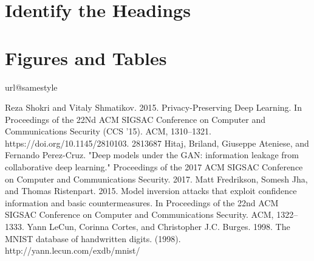 \documentclass[conference]{IEEEtran}
\begin{document}
\section{Identify the Headings}


\section{Figures and Tables}



%
\begin{thebibliography}{10}
\providecommand{\url}[1]{#1}
\csname url@samestyle\endcsname
\providecommand{\newblock}{\relax}
\providecommand{\bibinfo}[2]{#2}
\providecommand{\BIBentrySTDinterwordspacing}{\spaceskip=0pt\relax}
\providecommand{\BIBentryALTinterwordstretchfactor}{4}
\providecommand{\BIBentryALTinterwordspacing}{\spaceskip=\fontdimen2\font plus
\BIBentryALTinterwordstretchfactor\fontdimen3\font minus
  \fontdimen4\font\relax}
\providecommand{\BIBforeignlanguage}[2]{{%
\expandafter\ifx\csname l@#1\endcsname\relax
\typeout{** WARNING: IEEEtran.bst: No hyphenation pattern has been}%
\typeout{** loaded for the language `#1'. Using the pattern for}%
\typeout{** the default language instead.}%
\else
\language=\csname l@#1\endcsname
\fi
#2}}
\providecommand{\BIBdecl}{\relax}
\BIBdecl

Reza Shokri and Vitaly Shmatikov. 2015. Privacy-Preserving Deep Learning.
In Proceedings of the 22Nd ACM SIGSAC Conference on Computer and Communications
Security (CCS ’15). ACM, 1310–1321. https://doi.org/10.1145/2810103.
2813687
Hitaj, Briland, Giuseppe Ateniese, and Fernando Perez-Cruz. "Deep models under the GAN: information leakage from collaborative deep learning." Proceedings of the 2017 ACM SIGSAC Conference on Computer and Communications Security. 2017.
Matt Fredrikson, Somesh Jha, and Thomas Ristenpart. 2015. Model inversion
attacks that exploit confidence information and basic countermeasures. In Proceedings
of the 22nd ACM SIGSAC Conference on Computer and Communications
Security. ACM, 1322–1333.
Yann LeCun, Corinna Cortes, and Christopher J.C. Burges. 1998. The MNIST
database of handwritten digits. (1998). http://yann.lecun.com/exdb/mnist/
\end{thebibliography}


\vspace{-0.4in}
\end{document}
